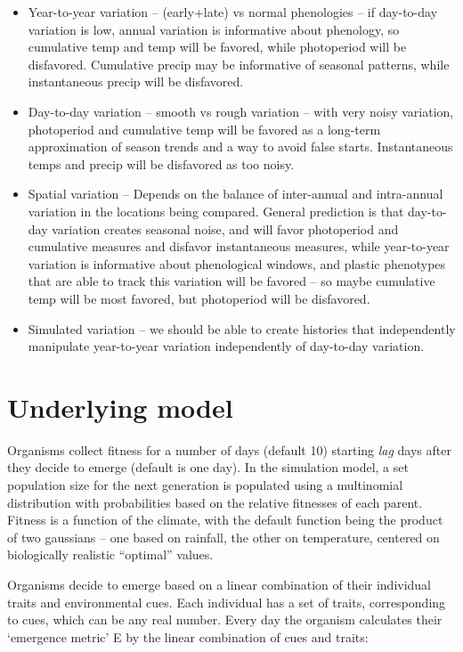 \documentclass[11pt,a4paper]{article}
\begin{document}
\begin{itemize}
\item Year-to-year variation – (early+late) vs normal phenologies – if day-to-day variation is low, annual variation is informative about phenology, so cumulative temp and temp will be favored, while photoperiod will be disfavored. Cumulative precip may be informative of seasonal patterns, while instantaneous precip will be disfavored. 
\item Day-to-day variation – smooth vs rough variation – with very noisy variation, photoperiod and cumulative temp will be favored as a long-term approximation of season trends and a way to avoid false starts. Instantaneous temps and precip will be disfavored as too noisy. 
\item Spatial variation – Depends on the balance of inter-annual and intra-annual variation in the locations being compared. General prediction is that day-to-day variation creates seasonal noise, and will favor photoperiod and cumulative measures and disfavor instantaneous measures, while year-to-year variation is informative about phenological windows, and plastic phenotypes that are able to track this variation will be favored – so maybe cumulative temp will be most favored, but photoperiod will be disfavored. 
\item Simulated variation – we should be able to create histories that independently manipulate year-to-year variation independently of day-to-day variation. 
\end{itemize}

\section{Underlying model}
Organisms collect fitness for a number of days (default 10) starting \textit{lag} days after they decide to emerge (default is one day). In the simulation model, a set population size for the next generation is populated using a multinomial distribution with probabilities based on the relative fitnesses of each parent. Fitness is a function of the climate, with the default function being the product of two gaussians -- one based on rainfall, the other on temperature, centered on biologically realistic ``optimal'' values.

Organisms decide to emerge based on a linear combination of their individual traits and environmental cues. Each individual has a set of traits, corresponding to cues, which can be any real number. Every day the organism calculates their `emergence metric' E by the linear combination of cues and traits:
\end{document}
